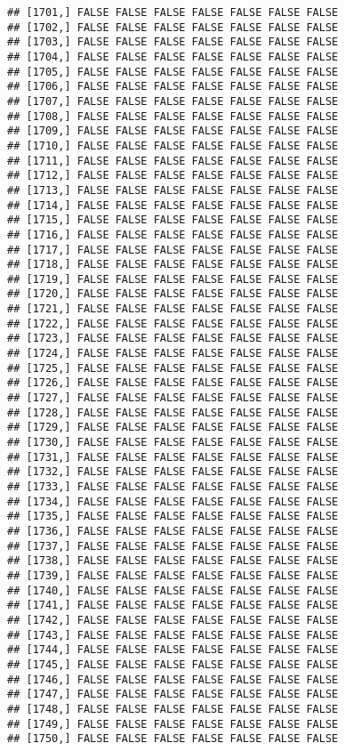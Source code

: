 \documentclass[
]{article}
\begin{document}
\begin{verbatim}
## [1701,] FALSE FALSE FALSE FALSE FALSE FALSE FALSE
## [1702,] FALSE FALSE FALSE FALSE FALSE FALSE FALSE
## [1703,] FALSE FALSE FALSE FALSE FALSE FALSE FALSE
## [1704,] FALSE FALSE FALSE FALSE FALSE FALSE FALSE
## [1705,] FALSE FALSE FALSE FALSE FALSE FALSE FALSE
## [1706,] FALSE FALSE FALSE FALSE FALSE FALSE FALSE
## [1707,] FALSE FALSE FALSE FALSE FALSE FALSE FALSE
## [1708,] FALSE FALSE FALSE FALSE FALSE FALSE FALSE
## [1709,] FALSE FALSE FALSE FALSE FALSE FALSE FALSE
## [1710,] FALSE FALSE FALSE FALSE FALSE FALSE FALSE
## [1711,] FALSE FALSE FALSE FALSE FALSE FALSE FALSE
## [1712,] FALSE FALSE FALSE FALSE FALSE FALSE FALSE
## [1713,] FALSE FALSE FALSE FALSE FALSE FALSE FALSE
## [1714,] FALSE FALSE FALSE FALSE FALSE FALSE FALSE
## [1715,] FALSE FALSE FALSE FALSE FALSE FALSE FALSE
## [1716,] FALSE FALSE FALSE FALSE FALSE FALSE FALSE
## [1717,] FALSE FALSE FALSE FALSE FALSE FALSE FALSE
## [1718,] FALSE FALSE FALSE FALSE FALSE FALSE FALSE
## [1719,] FALSE FALSE FALSE FALSE FALSE FALSE FALSE
## [1720,] FALSE FALSE FALSE FALSE FALSE FALSE FALSE
## [1721,] FALSE FALSE FALSE FALSE FALSE FALSE FALSE
## [1722,] FALSE FALSE FALSE FALSE FALSE FALSE FALSE
## [1723,] FALSE FALSE FALSE FALSE FALSE FALSE FALSE
## [1724,] FALSE FALSE FALSE FALSE FALSE FALSE FALSE
## [1725,] FALSE FALSE FALSE FALSE FALSE FALSE FALSE
## [1726,] FALSE FALSE FALSE FALSE FALSE FALSE FALSE
## [1727,] FALSE FALSE FALSE FALSE FALSE FALSE FALSE
## [1728,] FALSE FALSE FALSE FALSE FALSE FALSE FALSE
## [1729,] FALSE FALSE FALSE FALSE FALSE FALSE FALSE
## [1730,] FALSE FALSE FALSE FALSE FALSE FALSE FALSE
## [1731,] FALSE FALSE FALSE FALSE FALSE FALSE FALSE
## [1732,] FALSE FALSE FALSE FALSE FALSE FALSE FALSE
## [1733,] FALSE FALSE FALSE FALSE FALSE FALSE FALSE
## [1734,] FALSE FALSE FALSE FALSE FALSE FALSE FALSE
## [1735,] FALSE FALSE FALSE FALSE FALSE FALSE FALSE
## [1736,] FALSE FALSE FALSE FALSE FALSE FALSE FALSE
## [1737,] FALSE FALSE FALSE FALSE FALSE FALSE FALSE
## [1738,] FALSE FALSE FALSE FALSE FALSE FALSE FALSE
## [1739,] FALSE FALSE FALSE FALSE FALSE FALSE FALSE
## [1740,] FALSE FALSE FALSE FALSE FALSE FALSE FALSE
## [1741,] FALSE FALSE FALSE FALSE FALSE FALSE FALSE
## [1742,] FALSE FALSE FALSE FALSE FALSE FALSE FALSE
## [1743,] FALSE FALSE FALSE FALSE FALSE FALSE FALSE
## [1744,] FALSE FALSE FALSE FALSE FALSE FALSE FALSE
## [1745,] FALSE FALSE FALSE FALSE FALSE FALSE FALSE
## [1746,] FALSE FALSE FALSE FALSE FALSE FALSE FALSE
## [1747,] FALSE FALSE FALSE FALSE FALSE FALSE FALSE
## [1748,] FALSE FALSE FALSE FALSE FALSE FALSE FALSE
## [1749,] FALSE FALSE FALSE FALSE FALSE FALSE FALSE
## [1750,] FALSE FALSE FALSE FALSE FALSE FALSE FALSE

\end{verbatim}
\end{document}
